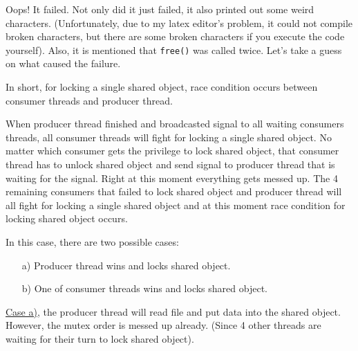 \documentclass{homework}
\begin{document}
Oops! It failed. Not only did it just failed, it also printed out some weird characters. (Unfortunately, due to my latex editor's problem, it could not compile broken characters, but there are some broken characters if you execute the code yourself). Also, it is mentioned that \texttt{free()} was called twice. Let's take a guess on what caused the failure.
\par
In short, for locking a single shared object, race condition occurs between consumer threads and producer thread. 

When producer thread finished and broadcasted signal to all waiting consumers threads, all consumer threads will fight for locking a single shared object. No matter which consumer gets the privilege to lock shared object, that consumer thread has to unlock shared object and send signal to producer thread that is waiting for the signal. Right at this moment everything gets messed up. The 4 remaining consumers that failed to lock shared object and producer thread will all fight for locking a single shared object and at this moment race condition for locking shared object occurs.
\par

In this case, there are two possible cases:
\begin{itemize}
   \item[a)] Producer thread wins and locks shared object.
   \item[b)] One of consumer threads wins and locks shared object.
\end{itemize}

\underline{Case a)}, the producer thread will read file and put data into the shared object. However, the mutex order is messed up already. (Since 4 other threads are waiting for their turn to lock shared object). 
\end{document}
